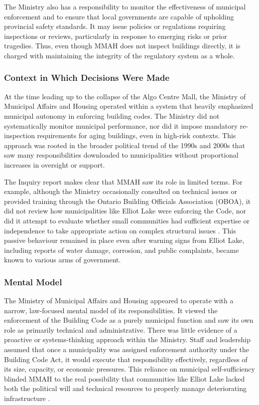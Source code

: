 \documentclass[12pt]{article}
\begin{document}
The Ministry also has a responsibility to monitor the effectiveness of municipal enforcement and to ensure that local governments are capable of upholding provincial safety standards. It may issue policies or regulations requiring inspections or reviews, particularly in response to emerging risks or prior tragedies. Thus, even though MMAH does not inspect buildings directly, it is charged with maintaining the integrity of the regulatory system as a whole.

\subsubsection*{Context in Which Decisions Were Made}

At the time leading up to the collapse of the Algo Centre Mall, the Ministry of Municipal Affairs and Housing operated within a system that heavily emphasized municipal autonomy in enforcing building codes. The Ministry did not systematically monitor municipal performance, nor did it impose mandatory re-inspection requirements for aging buildings, even in high-risk contexts. This approach was rooted in the broader political trend of the 1990s and 2000s that saw many responsibilities downloaded to municipalities without proportional increases in oversight or support.

The Inquiry report makes clear that MMAH saw its role in limited terms. For example, although the Ministry occasionally consulted on technical issues or provided training through the Ontario Building Officials Association (OBOA), it did not review how municipalities like Elliot Lake were enforcing the Code, nor did it attempt to evaluate whether small communities had sufficient expertise or independence to take appropriate action on complex structural issues \cite[p405-046]{AlgoLakeReport1}. This passive behaviour remained in place even after warning signs from Elliot Lake, including reports of water damage, corrosion, and public complaints, became known to various arms of government.

\subsubsection*{Mental Model}

The Ministry of Municipal Affairs and Housing appeared to operate with a narrow, law-focused mental model of its responsibilities. It viewed the enforcement of the Building Code as a purely municipal function and saw its own role as primarily technical and administrative. There was little evidence of a proactive or systems-thinking approach within the Ministry. Staff and leadership assumed that once a municipality was assigned enforcement authority under the Building Code Act, it would execute that responsibility effectively, regardless of its size, capacity, or economic pressures. This reliance on municipal self-sufficiency blinded MMAH to the real possibility that communities like Elliot Lake lacked both the political will and technical resources to properly manage deteriorating infrastructure \cite[p406]{AlgoLakeReport1}.
\end{document}

